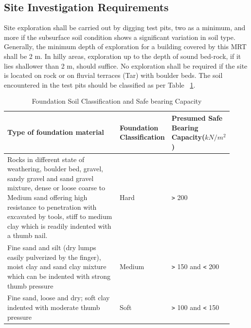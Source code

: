 \subsection{Site Investigation Requirements}
Site exploration shall be carried out by digging test pits, two as a minimum, and more if the subsurface soil condition shows a significant variation in soil type. Generally, the minimum depth of exploration for a building covered by this MRT shall be 2 m. In hilly areas, exploration up to the depth of sound bed-rock, if it lies shallower than 2 m, should suffice. No exploration shall be required if the site is located on rock or on fluvial terraces (Tar) with boulder beds. The soil encountered in the test pits should be classified as per Table ~\ref{foundation-soil-classification}.
\begin{table}
  \centering
  \caption{Foundation Soil Classification and Safe bearing Capacity}
  \label{foundation-soil-classification}
  \begin{tabular}{|p{0.5\linewidth}|p{0.17\linewidth}|p{0.25\linewidth}|}
  \hline \bfseries{Type of foundation material} & \bfseries{Foundation Classification} & \bfseries{Presumed Safe Bearing Capacity($kN/m^2$)}\\
  \hline Rocks in different state of weathering, boulder bed, gravel, sandy gravel and sand gravel mixture, dense or loose coarse to Medium sand offering high resistance to penetration with excavated by tools, stiff to medium clay which is readily indented with a thumb nail. & Hard & \verb">" 200\\
  \hline Fine sand and silt (dry lumps easily pulverized by the finger), moist clay and sand clay mixture which can be indented with strong thumb pressure & Medium & \verb">" 150 and \verb"<" 200\\
  \hline Fine sand, loose and dry; soft clay indented with moderate thumb pressure & Soft & \verb">" 100 and \verb"<" 150\\
  \hline
  \end{tabular}
\end{table} 
